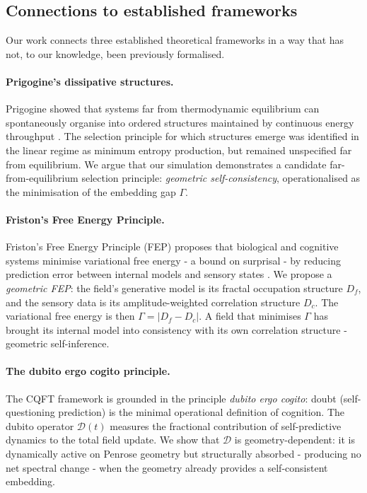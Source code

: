 \documentclass[12pt,a4paper]{article}
\theoremstyle{plain}
\theoremstyle{definition}
\begin{document}
\subsection{Connections to established frameworks}

Our work connects three established theoretical frameworks in a way that
has not, to our knowledge, been previously formalised.

\paragraph{Prigogine's dissipative structures.}
Prigogine showed that systems far from thermodynamic equilibrium can
spontaneously organise into ordered structures maintained by continuous
energy throughput \citep{prigogine1977}. The selection principle for which
structures emerge was identified in the linear regime as minimum entropy
production, but remained unspecified far from equilibrium. We argue that
our simulation demonstrates a candidate far-from-equilibrium selection
principle: \emph{geometric self-consistency}, operationalised as the
minimisation of the embedding gap $\Gamma$.

\paragraph{Friston's Free Energy Principle.}
Friston's Free Energy Principle (FEP) proposes that biological and cognitive
systems minimise variational free energy - a bound on surprisal - by reducing
prediction error between internal models and sensory states
\citep{friston2010,friston2019}. We propose a \emph{geometric FEP}: the
field's generative model is its fractal occupation structure $D_f$, and the
sensory data is its amplitude-weighted correlation structure $D_c$. The
variational free energy is then $\Gamma = |D_f - D_c|$. A field that
minimises $\Gamma$ has brought its internal model into consistency with its
own correlation structure - geometric self-inference.

\paragraph{The dubito ergo cogito principle.}
The CQFT framework is grounded in the principle \emph{dubito ergo cogito}:
doubt (self-questioning prediction) is the minimal operational definition
of cognition. The dubito operator $\mathcal{D}(t)$ measures the fractional
contribution of self-predictive dynamics to the total field update. We show
that $\mathcal{D}$ is geometry-dependent: it is dynamically active on
Penrose geometry but structurally absorbed - producing no net spectral
change - when the geometry already provides a self-consistent embedding.
\end{document}
